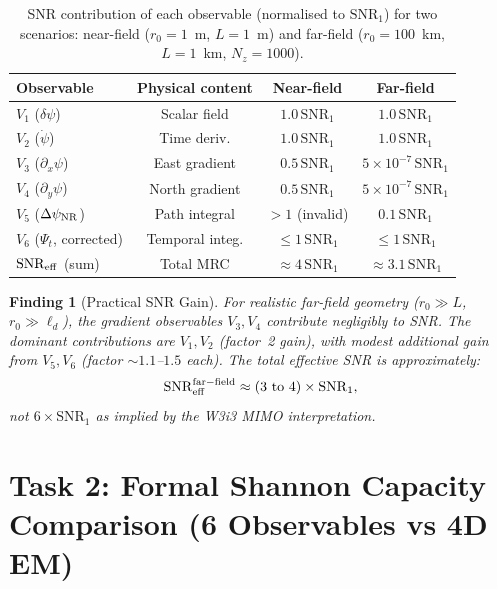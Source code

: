 \documentclass[aps,prd,twocolumn,superscriptaddress,nofootinbib]{revtex4-2}
\newcommand{\SNR}{\mathrm{SNR}}
\newtheorem{finding}{Finding}
\begin{document}
\begin{table}[h]
\centering
\caption{SNR contribution of each observable (normalised to $\SNR_1$)
for two scenarios: near-field ($r_0 = 1$~m, $L = 1$~m) and far-field
($r_0 = 100$~km, $L = 1$~km, $N_z = 1000$).}
\begin{tabular}{lccc}
\hline\hline
Observable & Physical content & Near-field & Far-field \\
\hline
$V_1$ ($\delta\psi$) & Scalar field & $1.0\,\SNR_1$ & $1.0\,\SNR_1$ \\
$V_2$ ($\dot\psi$) & Time deriv. & $1.0\,\SNR_1$ & $1.0\,\SNR_1$ \\
$V_3$ ($\partial_x\psi$) & East gradient & $0.5\,\SNR_1$ & $5\times10^{-7}\,\SNR_1$ \\
$V_4$ ($\partial_y\psi$) & North gradient & $0.5\,\SNR_1$ & $5\times10^{-7}\,\SNR_1$ \\
$V_5$ ($\Delta\psi_{\rm NR}$) & Path integral & $>1$ (invalid) & $0.1\,\SNR_1$ \\
$V_6$ ($\Psi_t$, corrected) & Temporal integ. & $\leq 1\,\SNR_1$ & $\leq 1\,\SNR_1$ \\
\hline
$\SNR_{\rm eff}$ (sum) & Total MRC & $\approx 4\,\SNR_1$ & $\approx 3.1\,\SNR_1$ \\
\hline\hline
\end{tabular}
\label{tab:SNR-contributions}
\end{table}

\begin{finding}[Practical SNR Gain]
\label{find:snr-gain}
For realistic far-field geometry ($r_0 \gg L$, $r_0 \gg \ell_d$), the
gradient observables $V_3, V_4$ contribute negligibly to SNR. The dominant
contributions are $V_1, V_2$ (factor~2 gain), with modest additional gain
from $V_5, V_6$ (factor $\sim 1.1$--$1.5$ each). The total effective
SNR is approximately:
\begin{equation}
\SNR_{\rm eff}^{\rm far-field} \approx (3\text{ to }4) \times \SNR_1,
\label{eq:SNR-eff-farfield}
\end{equation}
not $6\times\SNR_1$ as implied by the W3i3 MIMO interpretation.
\end{finding}

\section{Task 2: Formal Shannon Capacity Comparison (6 Observables vs 4D EM)}
\label{sec:capacity-comparison}
\end{document}

